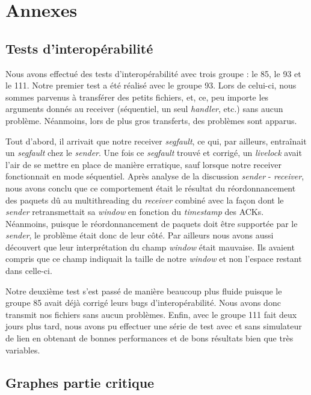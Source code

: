 \documentclass[../main.tex]{subfiles}
\begin{document}
\section{Annexes}
\label{sec:annexes}

\subsection{Tests d'interopérabilité}
\label{sec:interop}

Nous avons effectué des tests d'interopérabilité avec trois groupe : le 85, le 93 et le 111. Notre premier test a été réalisé avec le groupe 93. Lors de celui-ci, 
nous sommes parvenus à transférer des petits fichiers, et, ce, peu importe les arguments donnés au receiver (séquentiel, un seul \textit{handler}, etc.) sans 
aucun problème. Néanmoins, lors de plus gros transferts, des problèmes sont apparus.

Tout d'abord, il arrivait que notre receiver \textit{segfault}, ce qui, par ailleurs, entraînait un \textit{segfault} chez le \textit{sender}.
Une fois ce \textit{segfault} trouvé et corrigé, un \textit{livelock} avait l'air de se mettre en place de manière erratique, sauf lorsque 
notre receiver fonctionnait en mode séquentiel. Après analyse de la discussion \textit{sender} - \textit{receiver}, nous avons conclu
que ce comportement était le résultat du réordonnancement des paquets dû au multithreading du \textit{receiver} combiné avec la façon dont le 
\textit{sender} retransmettait sa \textit{window} en fonction du \textit{timestamp} des ACKs. Néanmoins, puisque le réordonnancement de paquets 
doit être supportée par le \textit{sender}, le problème était donc de leur côté. Par ailleurs nous avons aussi découvert que leur interprétation du 
champ \textit{window} était mauvaise. Ils avaient compris que ce champ indiquait la taille de notre \textit{window} et non l'espace restant dans celle-ci.

Notre deuxième test s'est passé de manière beaucoup plus fluide puisque le groupe 85 avait déjà corrigé leurs bugs d'interopérabilité.
Nous avons donc transmit nos fichiers sans aucun problèmes. Enfin, avec le groupe 111 fait deux jours plus tard, nous avons pu effectuer une série de test
avec et sans simulateur de lien en obtenant de bonnes performances et de bons résultats bien que très variables.

\subsection{Graphes partie critique}
\label{sec:graph_crit}
\end{document}
